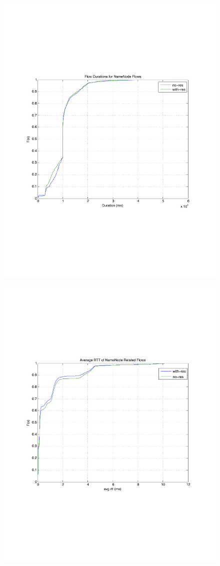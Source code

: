 \begin{figure}
\centering
\begin{minipage}{.5\textwidth}
  \centering
  \includegraphics[width=.9\linewidth]{figures/flow_durations.pdf}
  \label{fig:duration_cdf}
\end{minipage}%
\begin{minipage}{.5\textwidth}
  \centering
  \includegraphics[width=.9\linewidth]{figures/avg_rtts_NN_flows.pdf}

\end{minipage}
\end{figure}
